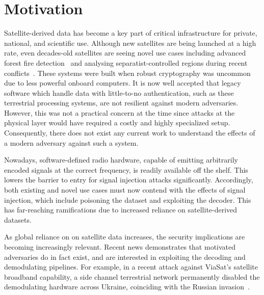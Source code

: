 \section{Motivation}

Satellite-derived data has become a key part of critical infrastructure for private, national, and scientific use.
Although new satellites are being launched at a high rate, even decades-old satellites are seeing novel use cases including advanced forest fire detection~\cite{nasaFirms} and analysing separatist-controlled regions during recent conflicts~\cite{separatistLuminosity}. %
These systems were built when robust cryptography was uncommon due to less powerful onboard computers.
It is now well accepted that legacy software which handle data with little-to-no authentication, such as these terrestrial processing systems, are not resilient against modern adversaries.
However, this was not a practical concern at the time since attacks at the physical layer would have required a costly and highly specialized setup.
Consequently, there does not exist any current work to understand the effects of a modern adversary against such a system.

Nowadays, software-defined radio hardware, capable of emitting arbitrarily encoded signals at the correct frequency, is readily available off the shelf.
This lowers the barrier to entry for signal injection attacks significantly.
Accordingly, both existing and novel use cases must now contend with the effects of signal injection, which include poisoning the dataset and exploiting the decoder.
This has far-reaching ramifications due to increased reliance on satellite-derived datasets.


As global reliance on on satellite data increases, the security implications are becoming increasingly relevant.
Recent news demonstrates that motivated adversaries do in fact exist, and are interested in exploiting the decoding and demodulating pipelines.
For example, in a recent attack against ViaSat's satellite broadband capability, a side channel terrestrial network permanently disabled the demodulating hardware across Ukraine, coinciding with the Russian invasion~\cite{satcomAnalysis}.

